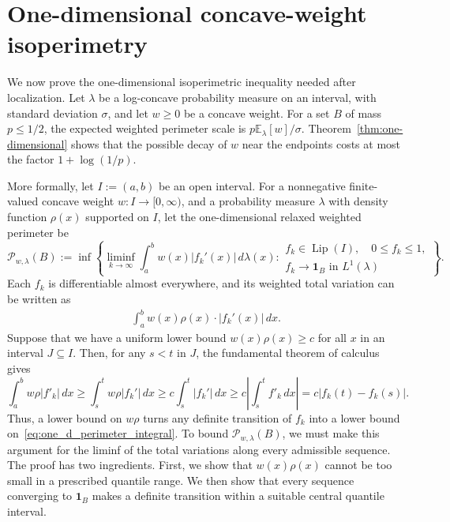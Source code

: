\documentclass[11pt]{article}
\theoremstyle{definition}
\theoremstyle{remark}
\newcommand{\E}{\mathbb E}
\newcommand{\Lip}{\operatorname{Lip}}
\newcommand{\cP}{\mathcal P}
\newcommand{\one}{\mathbf 1}
\newcommand{\rK}{r_K}
\begin{document}

\section{One-dimensional concave-weight isoperimetry}
\label{sec:one-dimensional}
We now prove the one-dimensional isoperimetric inequality needed after localization. Let \(\lambda\) be a log-concave probability measure on an interval, with standard deviation \(\sigma\), and let \(w\ge0\) be a concave weight. For a set \(B\) of mass \(p\le1/2\), the expected weighted perimeter scale is $p\E_\lambda[w]/\sigma$. Theorem~\ref{thm:one-dimensional} shows that the possible decay of \(w\) near the endpoints costs at most the factor \(1+\log(1/p)\).


More formally, let $I:=(a,b)$ be an open interval. For a nonnegative finite-valued concave weight $w:I\to[0,\infty)$, and a probability measure $\lambda$ with density function $\rho(x)$ supported on $I$, let the one-dimensional relaxed weighted perimeter be
\begin{equation}\label{eq:def_P_w_lambda}
 \cP_{w,\lambda}(B)
 :=\inf\left\{
   \liminf_{k\to\infty}\int_a^b w(x)|f_k'(x)|\,d\lambda(x):
   \begin{array}{l}
    f_k\in\Lip(I),\quad 0\le f_k\le1,\\
    f_k\to\one_B\text{ in }L^1(\lambda)
   \end{array}
 \right\}.
\end{equation}
Each $f_k$ is differentiable almost everywhere, and its weighted total variation can be written as
\begin{align}\label{eq:one_d_perimeter_integral}
    \int_a^b w(x)\rho(x)\cdot |f_k'(x)|\,dx.
\end{align}
Suppose that we have a uniform lower bound $w(x)\rho(x)\ge c$ for all $x$ in an interval $J\subseteq I$. Then, for any $s<t$ in $J$, the fundamental theorem of calculus gives
\[
 \int_a^bw\rho|f'_k|\,dx\geq \int_s^t w\rho|f_k'|\,dx
 \ge c\int_s^t|f_k'|\,dx \geq c\left|\int_s^tf'_k\,dx\right|
 = c|f_k(t)-f_k(s)|.
\]
Thus, a lower bound on $w\rho$ turns any definite transition of $f_k$ into
a lower bound on~\eqref{eq:one_d_perimeter_integral}.  To bound $\cP_{w,\lambda}(B)$, we must make this argument for the liminf of the total variations along every admissible sequence.
The proof has two ingredients.  First, we show that $w(x)\rho(x)$ cannot be
too small in a prescribed quantile range.  We then show that every sequence
converging to $\one_B$ makes a definite transition within a suitable central
quantile interval.  
\end{document}
